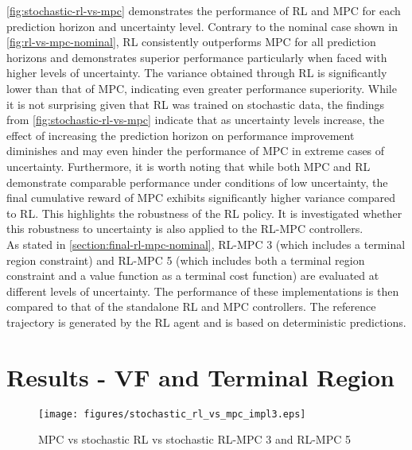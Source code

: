 \autoref{fig:stochastic-rl-vs-mpc} demonstrates the performance of RL and MPC for each prediction horizon and uncertainty level. Contrary to the nominal case shown in \ref{fig:rl-vs-mpc-nominal}, RL consistently outperforms MPC for all prediction horizons and demonstrates superior performance particularly when faced with higher levels of uncertainty. The variance obtained through RL is significantly lower than that of MPC, indicating even greater performance superiority. While it is not surprising given that RL was trained on stochastic data, the findings from \autoref{fig:stochastic-rl-vs-mpc} indicate that as uncertainty levels increase, the effect of increasing the prediction horizon on performance improvement diminishes and may even hinder the performance of MPC in extreme cases of uncertainty. Furthermore, it is worth noting that while both MPC and RL demonstrate comparable performance under conditions of low uncertainty, the final cumulative reward of MPC exhibits significantly higher variance compared to RL. This highlights the robustness of the RL policy. It is investigated whether this robustness to uncertainty is also applied to the RL-MPC controllers.\\
As stated in \autoref{section:final-rl-mpc-nominal}, RL-MPC 3 (which includes a terminal region constraint) and RL-MPC 5 (which includes both a terminal region constraint and a value function as a terminal cost function) are evaluated at different levels of uncertainty. The performance of these implementations is then compared to that of the standalone RL and MPC controllers. The reference trajectory is generated by the RL agent and is based on deterministic predictions.





\section{Results - VF and Terminal Region}


\begin{figure}[H]
	\centering
	\texttt{[image: figures/stochastic\_rl\_vs\_mpc\_impl3.eps]}
	\caption{MPC vs stochastic RL vs stochastic RL-MPC 3 and RL-MPC 5}
	\label{fig:stochastic-mpv-vs-rl-rlmpc3-vs-rlmpc5}
\end{figure}

